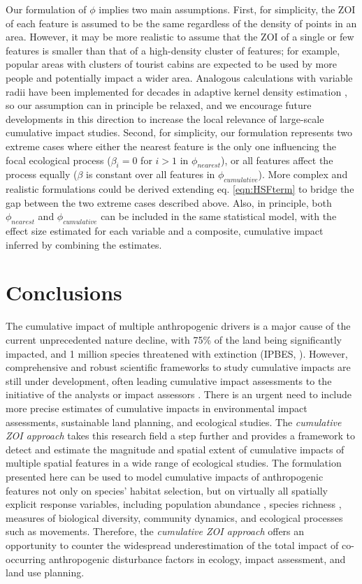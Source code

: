 \documentclass[titlepage]{article}
\begin{document}
Our formulation of $\phi$ implies two main assumptions. First, for simplicity, the ZOI of each feature is assumed to be the same regardless of the density of points in an area. However, it may be more realistic to assume that the ZOI of a single or few features is smaller than that of a high-density cluster of features; for example, popular areas with clusters of tourist cabins are expected to be used by more people and potentially impact a wider area. Analogous calculations with variable radii have been implemented for decades in adaptive kernel density estimation \citep{worton_kernel_1989}, so our assumption can in principle be relaxed, and we encourage future developments in this direction to increase the local relevance of large-scale cumulative impact studies. Second, for simplicity, our formulation represents two extreme cases where either the nearest feature is the only one influencing the focal ecological process ($\beta_i = 0$ for $i > 1$ in $\phi_{nearest}$), or all features affect the process equally ($\beta$ is constant over all features in $\phi_{cumulative}$). More complex and realistic formulations could be derived extending eq. \ref{eqn:HSFterm} to bridge the gap between the two extreme cases described above. Also, in principle, both $\phi_{nearest}$ and $\phi_{cumulative}$ can be included in the same statistical model, with the effect size estimated for each variable and a composite, cumulative impact inferred by combining the estimates.

\section{Conclusions}

The cumulative impact of multiple anthropogenic drivers is a major cause of the current unprecedented nature decline, with 75\% of the land being significantly impacted, and 1 million species threatened with extinction (IPBES, \citeyear{diaz_ipbes_2019}). However, comprehensive and robust scientific frameworks to study cumulative impacts are still under development, often leading cumulative impact assessments to the initiative of the analysts or impact assessors \citep{johnson_regulating_2011}. There is an urgent need to include more precise estimates of cumulative impacts in environmental impact assessments, sustainable land planning, and ecological studies. The \textit{cumulative ZOI approach} takes this research field a step further and provides a framework to detect and estimate the magnitude and spatial extent of cumulative impacts of multiple spatial features in a wide range of ecological studies. The formulation presented here can be used to model cumulative impacts of anthropogenic features not only on species’ habitat selection, but on virtually all spatially explicit response variables, including population abundance \citep[e.g.][]{benitez-lopez_impacts_2010}, species richness \citep[e.g.][]{ficetola_ecological_2009}, measures of biological diversity, community dynamics, and ecological processes such as movements. Therefore, the \textit{cumulative ZOI approach} offers an opportunity to counter the widespread underestimation of the total impact of co-occurring anthropogenic disturbance factors in ecology, impact assessment, and land use planning.
      
\end{document}
